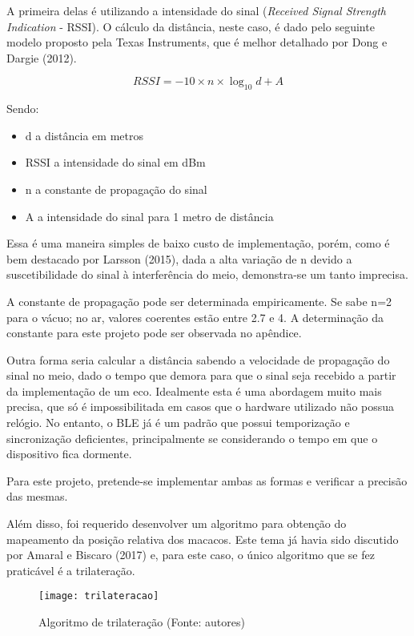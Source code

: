 A primeira delas é utilizando a intensidade do sinal (\textit{Received Signal Strength Indication} - RSSI). O cálculo da distância, neste caso, é dado pelo seguinte modelo proposto pela Texas Instruments, que é melhor detalhado por Dong e Dargie (2012).

\begin{equation}
RSSI = -10 \times n \times \log_{10} d + A
\end{equation}

Sendo:
\begin{itemize}
\item d a distância em metros
\item RSSI a intensidade do sinal em dBm
\item n a constante de propagação do sinal
\item A a intensidade do sinal para 1 metro de distância
\end{itemize}

Essa é uma maneira simples de baixo custo de implementação, porém, como é bem destacado por Larsson (2015), dada a alta variação de n devido a suscetibilidade do sinal à interferência do meio, demonstra-se um tanto imprecisa.

A constante de propagação pode ser determinada empiricamente. Se sabe n=2 para o vácuo; no ar, valores coerentes estão entre 2.7 e 4. A determinação da constante para este projeto pode ser observada no apêndice.

Outra forma seria calcular a distância sabendo a velocidade de propagação do sinal no meio, dado o tempo que demora para que o sinal seja recebido a partir da implementação de um eco. Idealmente esta é uma abordagem muito mais precisa, que só é impossibilitada em casos que o hardware utilizado não possua relógio. No entanto, o BLE já é um padrão que possui temporização e sincronização deficientes, principalmente se considerando o tempo em que o dispositivo fica dormente.

Para este projeto, pretende-se implementar ambas as formas e verificar a precisão das mesmas.

Além disso, foi requerido desenvolver um algoritmo para obtenção do mapeamento da posição relativa dos macacos. Este tema já havia sido discutido por Amaral e Biscaro (2017) e, para este caso, o único algoritmo que se fez praticável é a trilateração.

\begin{figure}[ht]
  \centering
    \texttt{[image: trilateracao]}
  \caption{Algoritmo de trilateração (Fonte: autores)}
\end{figure}
\FloatBarrier

